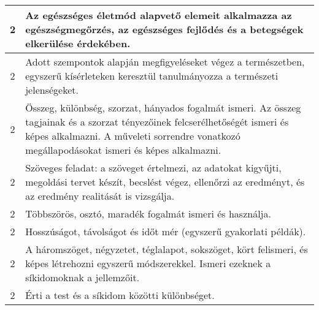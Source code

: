 \begin{longtable}{c | p{12cm} }
                                
                                          2 &  Az egészséges életmód alapvető elemeit alkalmazza az egészségmegőrzés, az egészséges fejlődés és a betegségek elkerülése érdekében. \\ \hline
                                          2 &  Adott szempontok alapján megfigyeléseket végez a természetben, egyszerű kísérleteken keresztül tanulmányozza a természeti jelenségeket. \\ \hline
                                          2 &  Összeg, különbség, szorzat, hányados fogalmát ismeri. Az összeg tagjainak és a szorzat tényezőinek felcserélhetőségét ismeri és képes alkalmazni. A műveleti sorrendre vonatkozó megállapodásokat ismeri és képes alkalmazni. \\ \hline
                                          2 &  Szöveges feladat: a szöveget értelmezi, az adatokat kigyűjti, megoldási tervet készít, becslést végez, ellenőrzi az eredményt, és az eredmény realitását is vizsgálja. \\ \hline
                                          2 &  Többszörös, osztó, maradék fogalmát ismeri és használja. \\ \hline
                                          2 &  Hosszúságot, távolságot és időt mér (egyszerű gyakorlati példák). \\ \hline
                                          2 &  A háromszöget, négyzetet, téglalapot, sokszöget, kört felismeri, és képes létrehozni egyszerű módszerekkel. Ismeri ezeknek a síkidomoknak a jellemzőit. \\ \hline
                                          2 &  Érti a test és a síkidom közötti különbséget. \\ \hline
                                      

\end{longtable}
